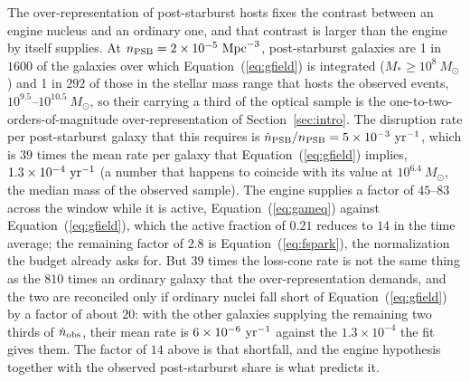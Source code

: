 \documentclass[twocolumn,pdftex]{aastex701}
\newcommand{\msun}{M_{\odot}\xspace}
\begin{document}
The over-representation of post-starburst hosts fixes the contrast between an engine nucleus and an ordinary one, and that contrast is larger than the engine by itself supplies. At $n_{\rm PSB} = 2 \times 10^{-5}~{\rm Mpc}^{-3}$, post-starburst galaxies are 1 in $1600$ of the galaxies over which Equation~(\ref{eq:gfield}) is integrated ($M_{\ast} \geq 10^{8}~\msun$) and 1 in $292$ of those in the stellar mass range that hosts the observed events, $10^{9.5}$--$10^{10.5}~\msun$, so their carrying a third of the optical sample is the one-to-two-orders-of-magnitude over-representation of Section~\ref{sec:intro}. The disruption rate per post-starburst galaxy that this requires is $\dot{n}_{\rm PSB}/n_{\rm PSB} = 5 \times 10^{-3}~{\rm yr}^{-1}$, which is $39$ times the mean rate per galaxy that Equation~(\ref{eq:gfield}) implies, $1.3 \times 10^{-4}~{\rm yr}^{-1}$ (a number that happens to coincide with its value at $10^{6.4}~\msun$, the median mass of the observed sample). The engine supplies a factor of $45$--$83$ across the window while it is active, Equation~(\ref{eq:gameq}) against Equation~(\ref{eq:gfield}), which the active fraction of $0.21$ reduces to $14$ in the time average; the remaining factor of $2.8$ is Equation~(\ref{eq:fspark}), the normalization the budget already asks for. But $39$ times the loss-cone rate is not the same thing as the $810$ times an ordinary galaxy that the over-representation demands, and the two are reconciled only if ordinary nuclei fall short of Equation~(\ref{eq:gfield}) by a factor of about $20$: with the other galaxies supplying the remaining two thirds of $\dot{n}_{\rm obs}$, their mean rate is $6 \times 10^{-6}~{\rm yr}^{-1}$ against the $1.3 \times 10^{-4}$ the fit gives them. The factor of $14$ above is that shortfall, and the engine hypothesis together with the observed post-starburst share is what predicts it.
\end{document}

